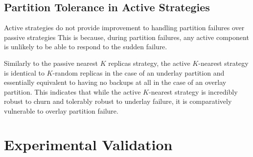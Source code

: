	
	
	\subsection{Partition Tolerance in Active Strategies}
	Active strategies do not provide improvement to handling partition failures over passive strategies
	This is because, during partition failures, any active component is unlikely to be able to respond to the sudden failure.
	
	Similarly to the passive nearest $K$ replicas strategy, the active $K$-nearest strategy is identical to $K$-random replicas in the case of an underlay partition and essentially equivalent to having no backups at all in the case of an overlay partition.
	This indicates that while the active $K$-nearest strategy is incredibly robust to churn and tolerably robust to underlay failure, it is comparatively vulnerable to overlay partition failure.
	
	
	\section{Experimental Validation}
	

